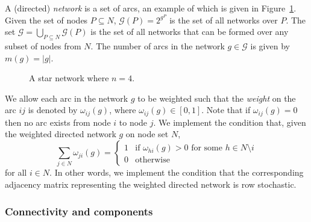 \documentclass[11pt,fleqn]{article}
\begin{document}

A (directed) \emph{network} is a set of arcs, an example of which is given in Figure~\ref{fig:starNetwork}. Given the set of nodes $P \subseteq N$, $\mathcal{G}(P) = 2^{g^{P}}$ is the set of all networks over $P$. The set $\mathcal{G} = \bigcup_{P \subseteq N} \mathcal{G}(P)$ is the set of all networks that can be formed over any subset of nodes from $N$. The number of arcs in the network $g \in \mathcal{G}$ is given by $m(g) = |g|$.

\begin{figure}[t]
\begin{center}
\end{center}
\caption{A star network where $n = 4$.}
\label{fig:starNetwork}
\end{figure}

We allow each arc in the network $g$ to be weighted such that the \emph{weight} on the arc $ij$ is denoted by $\omega_{ij}(g)$, where $\omega_{ij}(g) \in [0,1]$. Note that if $\omega_{ij}(g) = 0$ then no arc exists from node $i$ to node $j$. We implement the condition that, given the weighted directed network $g$ on node set $N$,
\begin{equation} 
\sum_{j \in N} \omega_{ji}(g) = \left\{ \begin{array}{ll}
                               1 & \mbox{if } \omega_{hi}(g) > 0 \mbox{ for some } h \in N \setminus i\\
                               0 & \mbox{otherwise}\end{array} \right.
\end{equation}
for all $i \in N$. In other words, we implement the condition that the corresponding adjacency matrix representing the weighted directed network is row stochastic.

\subsubsection{Connectivity and components}
\end{document}
